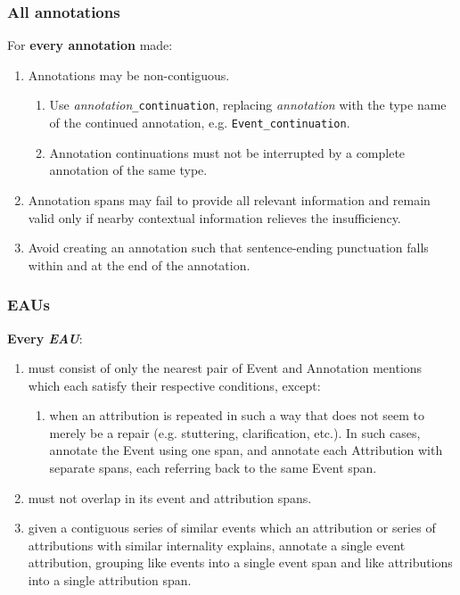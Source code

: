 \documentclass[a4paper,12pt]{article}
\begin{document}
    \subsubsection{All annotations}
    For \textbf{every annotation} made:
        \begin{enumerate}
            \item Annotations may be non-contiguous.
                \begin{enumerate}
                    \item Use \emph{annotation}\texttt{\_continuation}, replacing \emph{annotation} with the type name of the continued annotation, e.g. \texttt{Event\_continuation}.
                    \item Annotation continuations must not be interrupted by a complete annotation of the same type.
                \end{enumerate}
            \item Annotation spans may fail to provide all relevant information and remain valid only if nearby contextual information relieves the insufficiency.
            \item Avoid creating an annotation such that sentence-ending punctuation falls within and at the end of the annotation.
        \end{enumerate}


    \subsubsection{EAUs}
    \textbf{Every \emph{EAU}}:
        \begin{enumerate}
            \item must consist of only the nearest pair of Event and Annotation mentions which each satisfy their respective conditions, except:
                \begin{enumerate}
                    \item when an attribution is repeated in such a way that does not seem to merely be a repair (e.g. stuttering, clarification, etc.). In such cases, annotate the Event using one span, and annotate each Attribution with separate spans, each referring back to the same Event span.
                \end{enumerate}
            \item must not overlap in its event and attribution spans.
            \item given a contiguous series of similar events which an attribution or series of attributions with similar internality explains, annotate a single event attribution, grouping like events into a single event span and like attributions into a single attribution span.
        \end{enumerate}
\end{document}
